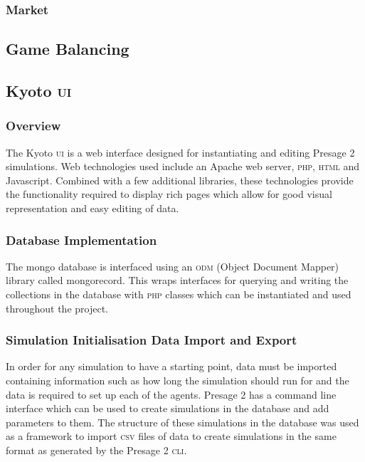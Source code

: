 \documentclass[]{article} %
\begin{document}
\subsubsection{Market}

\subsection{Game Balancing}


\subsection{Kyoto \textsc{ui}}

\subsubsection{Overview}

The Kyoto \textsc{ui} is a web interface designed for instantiating and editing Presage 2 simulations. Web technologies used include an Apache web server, \textsc{php}, \textsc{html} and Javascript. Combined with a few additional libraries, these technologies provide the functionality required to display rich pages which allow for good visual representation and easy editing of data.

\subsubsection{Database Implementation}

The mongo database is interfaced using an \textsc{odm} (Object Document Mapper) library called mongorecord. This wraps interfaces for querying and writing the collections in the database with \textsc{php} classes which can be instantiated and used throughout the project.

\subsubsection{Simulation Initialisation Data Import and Export}

In order for any simulation to have a starting point, data must be imported containing information such as how long the simulation should run for and the data is required to set up each of the agents. Presage 2 has a command line interface which can be used to create simulations in the database and add parameters to them. The structure of these simulations in the database was used as a framework to import \textsc{csv} files of data to create simulations in the same format as generated by the Presage 2 \textsc{cli}.
\end{document}
